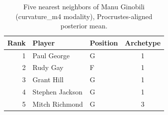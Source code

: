 \begin{table}[htbp]
  \centering\small
  \begin{tabular}{rllc}
    \toprule
    Rank & Player & Position & Archetype \\
    \midrule
    1 & Paul George & G & 1 \\
    2 & Rudy Gay & F & 1 \\
    3 & Grant Hill & G & 1 \\
    4 & Stephen Jackson & G & 1 \\
    5 & Mitch Richmond & G & 3 \\
    \bottomrule
  \end{tabular}
  \caption{Five nearest neighbors of Manu Ginobili (curvature_m4 modality), Procrustes-aligned posterior mean.}
  \label{tab:Manu_Ginobili_neighbors_curvature_m4}
\end{table}

